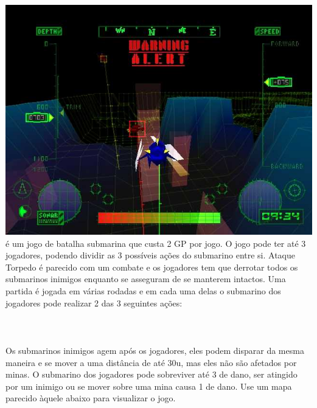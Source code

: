 \includegraphics[width=\columnwidth]{./art/goldsaucer/submarine.jpg}
%
\newpage
%
 é um jogo de batalha submarina que custa 2 GP por jogo. 
O jogo pode ter até 3 jogadores, podendo dividir as 3 possíveis ações do submarino entre si.
Ataque Torpedo é parecido com um combate e os jogadores tem que derrotar todos os submarinos inimigos enquanto se asseguram de se manterem intactos.
Uma partida é jogada em várias rodadas e em cada uma delas o submarino dos jogadores pode realizar 2 das 3 seguintes ações: \\
\\
\\
\\
Os submarinos inimigos agem após os jogadores, eles podem disparar da mesma maneira e se mover a uma distância de até 30u, mas eles não são afetados por minas.
O submarino dos jogadores pode sobreviver até 3 de dano, ser atingido por um inimigo ou se mover sobre uma mina causa 1 de dano.
Use um mapa parecido àquele abaixo para visualizar o jogo.
%
\vfill
%
